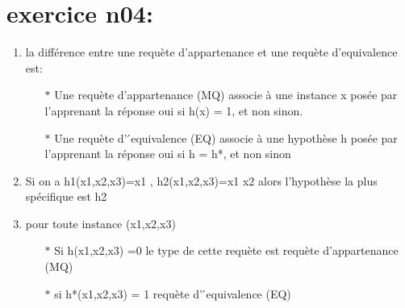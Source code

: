 \documentclass[11pt, a4paper]{article}
\begin{document}
\section*{exercice n04:}
\begin{enumerate}
   \item la différence entre une requète d’appartenance et une
    requète d’equivalence est:
    \begin{enumerate}
        \item[$\ast$] Une requète d’appartenance (MQ) associe à une instance x posée par
        l’apprenant la réponse oui si h(x) = 1, et non sinon.
        \item[$\ast$] Une requète d’ ́equivalence (EQ) associe à une hypothèse h posée par
        l’apprenant la  réponse oui si h = h*, et non sinon
    \end{enumerate}
    \item  Si on a  h1(x1,x2,x3)=x1 ,  h2(x1,x2,x3)=x1  x2 alors l'hypothèse la plus spécifique est h2 
    \item pour toute instance (x1,x2,x3)
    \begin{enumerate}
        \item[$\ast$] Si h(x1,x2,x3) =0 le type de cette requète est requète d’appartenance (MQ) 
        \item[$\ast$] si h*(x1,x2,x3) = 1 requète d’ ́equivalence (EQ)
    \end{enumerate}   
\end{enumerate}
\end{document}
